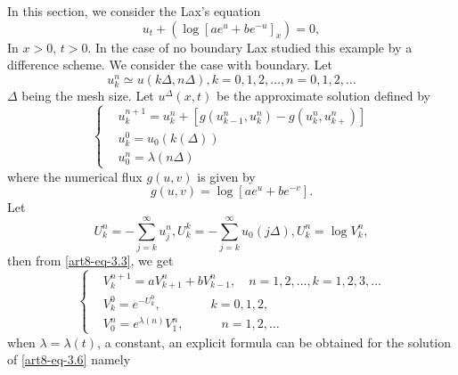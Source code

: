 In this section, we consider the Lax's equation
\begin{equation}\label{art8-eq-3.1}
u_{t}+ \left(\log \left[ae^{u} + be^{-u}\right]_{x}\right)= 0,
\end{equation}
In $x>0$, $t>0$. In the case of no boundary Lax \cite{art8-key9} studied this example by a difference scheme. We consider the case with boundary. Let
\begin{equation}\label{art8-eq-3.2}
u_{k}^{n}\simeq u(k\Delta, n\Delta), k=0,1,2,\ldots,n = 0,1,2,\ldots
\end{equation}
$\Delta$ being the mesh size. Let $u^{\Delta}(x,t)$ be the approximate solution defined by
\begin{equation}\label{art8-eq-3.3}
\left\{
\begin{aligned}
&u_{k}^{n+1} = u_{k}^{n} + \left[g(u_{k-1}^{n}, u_{k}^{n})-g(u_{k}^{n}, u_{k+}^{n})\right]\\
&u_{k}^{0} = u_{0}(k(\Delta))\\
&u_{0}^{n} = \lambda(n\Delta)
\end{aligned}
\right.
\end{equation}
where the numerical flux $g(u,v)$ is given by
\begin{equation}\label{art8-eq-3.4}
g(u,v) = \log \left[ae^{u} + be^{-v}\right].
\end{equation}
Let
\begin{equation}\label{art8-eq-3.5}
U_{k}^{n} = -\sum\limits_{j=k}^{\infty} u_{j}^{n}, U_{k}^{k} = -\sum_{j=k}^{\infty} u_{0}(j \Delta), U_{k}^{n}= \log V_{k}^{n},
\end{equation}
then from \eqref{art8-eq-3.3}, we get
\begin{equation}\label{art8-eq-3.6}
\left\{
\begin{aligned}
&V_{k}^{n+1} =aV_{k+1}^{n} +bV_{k-1}^{n}, \quad n=1,2,\ldots,k=1,2,3,\ldots\\
&V_{k}^{0}=e^{-U_{k}^{0}}, \qquad \qquad  k=0,1,2,\\
&V_{0}^{n} =e^{\lambda(n)}V_{1}^{n}, \qquad  \quad n=1,2,\ldots  
\end{aligned}
\right.
\end{equation}
when $\lambda = \lambda(t)$, a constant, an explicit formula can be obtained for the solution of \eqref{art8-eq-3.6} namely

